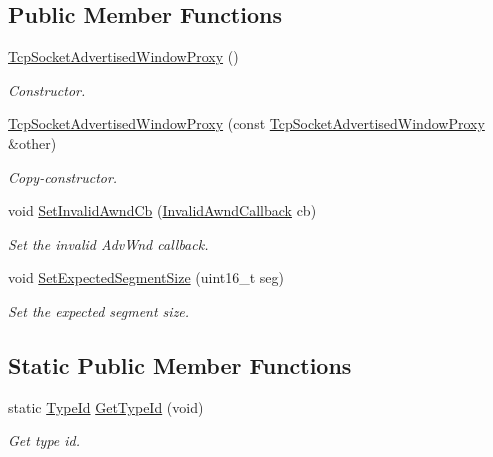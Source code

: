 \subsection*{Public Member Functions}
\begin{DoxyCompactItemize}
\item 
\hyperlink{classTcpSocketAdvertisedWindowProxy_a8aa14504c0027c5e301919e4d2e9f7c8}{Tcp\+Socket\+Advertised\+Window\+Proxy} ()
\begin{DoxyCompactList}\small\item\em Constructor. \end{DoxyCompactList}\item 
\hyperlink{classTcpSocketAdvertisedWindowProxy_ab56a2e534ec0c53bad4b3c4458f6bd44}{Tcp\+Socket\+Advertised\+Window\+Proxy} (const \hyperlink{classTcpSocketAdvertisedWindowProxy}{Tcp\+Socket\+Advertised\+Window\+Proxy} \&other)
\begin{DoxyCompactList}\small\item\em Copy-\/constructor. \end{DoxyCompactList}\item 
void \hyperlink{classTcpSocketAdvertisedWindowProxy_a35cffe13d7e272bcab3b561b15865c62}{Set\+Invalid\+Awnd\+Cb} (\hyperlink{classTcpSocketAdvertisedWindowProxy_aac665ab91330f420bf157fc0a28d3c87}{Invalid\+Awnd\+Callback} cb)
\begin{DoxyCompactList}\small\item\em Set the invalid Adv\+Wnd callback. \end{DoxyCompactList}\item 
void \hyperlink{classTcpSocketAdvertisedWindowProxy_a89e0c726d278b8604c12c0a2aa6adfcf}{Set\+Expected\+Segment\+Size} (uint16\+\_\+t seg)
\begin{DoxyCompactList}\small\item\em Set the expected segment size. \end{DoxyCompactList}\end{DoxyCompactItemize}
\subsection*{Static Public Member Functions}
\begin{DoxyCompactItemize}
\item 
static \hyperlink{classns3_1_1TypeId}{Type\+Id} \hyperlink{classTcpSocketAdvertisedWindowProxy_a4ed1c4bc3b31da4768b379f370055faa}{Get\+Type\+Id} (void)
\begin{DoxyCompactList}\small\item\em Get type id. \end{DoxyCompactList}\end{DoxyCompactItemize}
